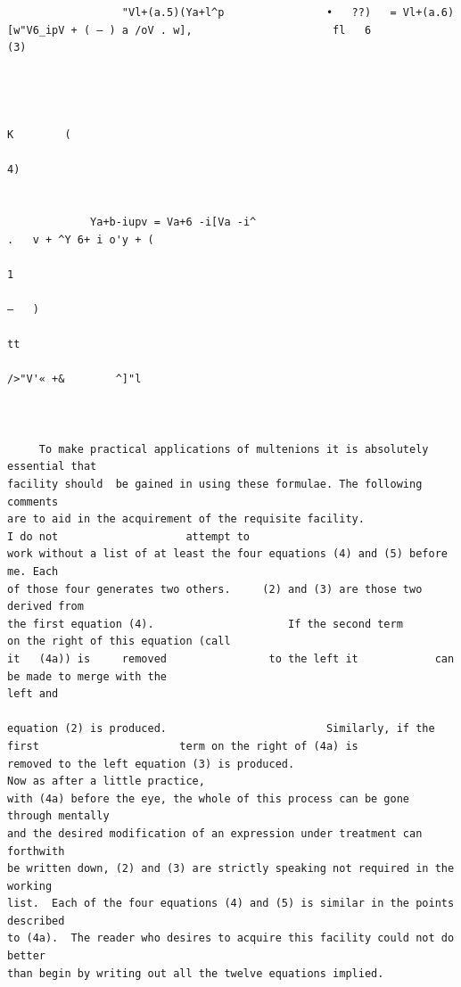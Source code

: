 \documentclass[10pt]{article}
\begin{document}
\begin{verbatim}
                  "Vl+(a.5)(Ya+l^p                •   ??)   = Vl+(a.6)[w"V6_ipV + ( — ) a /oV . w],                      fl   6                        (3)



                                                                                                                                              K        (
                                                                                                                                                           4)


             Ya+b-iupv = Va+6 -i[Va -i^                                 .   v + ^Y 6+ i o'y + (
                                                                                           1
                                                                                                    —   )
                                                                                                            tt
                                                                                                                 />"V'« +&        ^]"l



     To make practical applications of multenions it is absolutely essential that
facility should  be gained in using these formulae. The following comments
are to aid in the acquirement of the requisite facility.                                                    I do not                    attempt to
work without a list of at least the four equations (4) and (5) before me. Each
of those four generates two others.     (2) and (3) are those two derived from
the first equation (4).                     If the second term                   on the right of this equation (call
it   (4a)) is     removed                to the left it            can be made to merge with the                                                  left and

equation (2) is produced.                         Similarly, if the first                      term on the right of (4a) is
removed to the left equation (3) is produced.                                         Now as after a little practice,
with (4a) before the eye, the whole of this process can be gone through mentally
and the desired modification of an expression under treatment can forthwith
be written down, (2) and (3) are strictly speaking not required in the working
list.  Each of the four equations (4) and (5) is similar in the points described
to (4a).  The reader who desires to acquire this facility could not do better
than begin by writing out all the twelve equations implied.


\end{verbatim}
\end{document}
